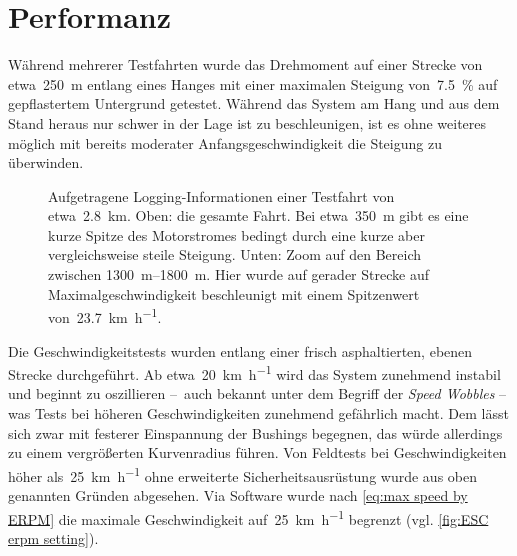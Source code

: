 	\section{Performanz}
		Während mehrerer Testfahrten wurde das Drehmoment auf einer Strecke von etwa~\qty{250}{\metre} entlang eines Hanges mit einer maximalen Steigung von~\qty{7,5}{\percent} auf gepflastertem Untergrund getestet.
		Während das System am Hang und aus dem Stand heraus nur schwer in der Lage ist zu beschleunigen, ist es ohne weiteres möglich mit bereits moderater Anfangsgeschwindigkeit die Steigung zu überwinden.
		\begin{figure}[h]
			\centering
			
			\caption[Aufgetragene Logging-Informationen einer Testfahrt]{Aufgetragene Logging-Informationen einer Testfahrt von etwa~\qty{2,8}{\kilo\metre}. Oben: die gesamte Fahrt. Bei etwa~\qty{350}{\metre} gibt es eine kurze Spitze des Motorstromes bedingt durch eine kurze aber vergleichsweise steile Steigung. Unten: Zoom auf den Bereich zwischen \qtyrange{1300}{1800}{\metre}. Hier wurde auf gerader Strecke auf Maximalgeschwindigkeit beschleunigt mit einem Spitzenwert von~\qty{23,7}{\kilo\metre\per\hour}.}%
			\label{fig:esc testdrive plot}
		\end{figure}
		Die Geschwindigkeitstests wurden entlang einer frisch asphaltierten, ebenen Strecke durchgeführt.
		Ab etwa~\qty{20}{\kilo\metre\per\hour} wird das System zunehmend instabil und beginnt zu oszillieren --~auch bekannt unter dem Begriff der \textit{Speed Wobbles} -- was Tests bei höheren Geschwindigkeiten zunehmend gefährlich macht.
		Dem lässt sich zwar mit festerer Einspannung der Bushings begegnen, das würde allerdings zu einem vergrößerten Kurvenradius führen.
		Von Feldtests bei Geschwindigkeiten höher als~\qty{25}{\kilo\metre\per\hour} ohne erweiterte Sicherheitsausrüstung wurde aus oben genannten Gründen abgesehen.
		Via Software wurde nach \cref{eq:max speed by ERPM} die maximale Geschwindigkeit auf~\qty{25}{\kilo\metre\per\hour} begrenzt (vgl. \cref{fig:ESC erpm setting}).
		
